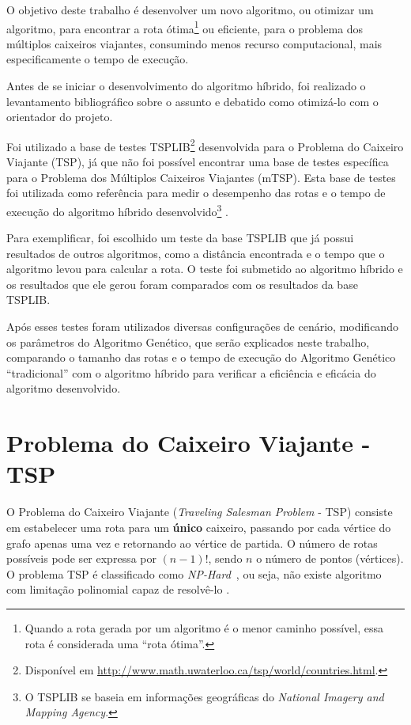 \documentclass[12pt,openright,a4paper,twoside]{tcc}
\begin{document}
		O objetivo deste trabalho é desenvolver um novo algoritmo, ou otimizar um algoritmo, para encontrar a rota ótima\footnote{Quando a rota gerada por um algoritmo é o menor caminho possível, essa rota é considerada uma ``rota ótima''.} ou eficiente, para o problema dos múltiplos caixeiros viajantes, consumindo menos recurso computacional, mais especificamente o tempo de execução.

		Antes de se iniciar o desenvolvimento do algoritmo híbrido, foi realizado o levantamento bibliográfico sobre o assunto e debatido como otimizá-lo com o orientador do projeto.

		Foi utilizado a base de testes TSPLIB\footnote{Disponível em \url{http://www.math.uwaterloo.ca/tsp/world/countries.html}.} desenvolvida para o Problema do Caixeiro Viajante (TSP), já que não foi possível encontrar uma base de testes específica para o Problema dos Múltiplos Caixeiros Viajantes (mTSP). Esta base de testes foi utilizada como referência para medir o desempenho das rotas e o tempo de execução do algoritmo híbrido desenvolvido\footnote{O TSPLIB se baseia em informações geográficas do \textit{National Imagery and Mapping Agency}.} \cite{tsplib}.

		Para exemplificar, foi escolhido um teste da base TSPLIB que já possui resultados de outros algoritmos, como a distância encontrada e o tempo que o algoritmo levou para calcular a rota. O teste foi submetido ao algoritmo híbrido e os resultados que ele gerou foram comparados com os resultados da base TSPLIB.

		Após esses testes foram utilizados diversas configurações de cenário, modificando os parâmetros do Algoritmo Genético, que serão explicados neste trabalho, comparando o tamanho das rotas e o tempo de execução do Algoritmo Genético ``tradicional'' com o algoritmo híbrido para verificar a eficiência e eficácia do algoritmo desenvolvido. 

	
	\chapter{Problema do Caixeiro Viajante - TSP}
		O Problema do Caixeiro Viajante (\textit{Traveling Salesman Problem} - TSP) consiste em estabelecer uma rota para um \textbf{único} caixeiro, passando por cada vértice do grafo apenas uma vez e retornando ao vértice de partida. O número de rotas possíveis pode ser expressa por $(n-1)!$, sendo $n$ o número de pontos (vértices).
		O problema TSP é classificado como \textit{NP-Hard}~\cite{0015-pdf}, ou seja, não existe algoritmo com limitação polinomial capaz de resolvê-lo \cite{0010-pdf}. 
		
\end{document}
